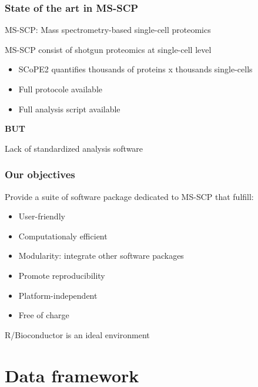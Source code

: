 \documentclass{beamer}
\newcommand{\frametitlesection}[1]{\frametitle{\centering #1 \footnotesize \hspace{0pt plus 1 filll} \insertsection}}
\begin{document}
\begin{frame}
    \frametitlesection{State of the art in MS-SCP}

    MS-SCP: Mass spectrometry-based single-cell proteomics 
    
    MS-SCP consist of shotgun proteomics at single-cell level 
    
    \begin{itemize}
        \item{SCoPE2 quantifies thousands of proteins x thousands single-cells}
        \item{Full protocole available}
        \item{Full analysis script available}
    \end{itemize}
    
    \textbf{BUT}
    
    Lack of standardized analysis software
\end{frame}

\begin{frame}
    \frametitlesection{Our objectives}

    Provide a suite of software package dedicated to MS-SCP that fulfill:

    \begin{itemize}
        \item{User-friendly}
        \item{Computationaly efficient}
        \item{Modularity: integrate other software packages}
        \item{Promote reproducibility}
        \item{Platform-independent}
        \item{Free of charge}
    \end{itemize}
    
    R/Bioconductor is an ideal environment
    
\end{frame}



\section{Data framework}
\end{document}
